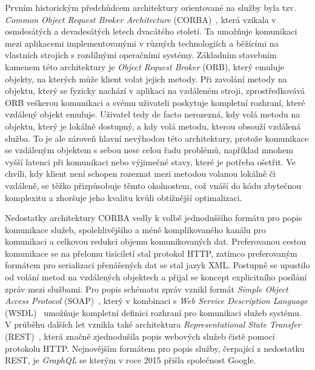 Prvním historickým předchůdcem architektury orientované na služby
byla tzv. \textit{Common Object Request Broker Architecture}
(CORBA)~\cite{siegel2000corba}, která vzikala v osmdesátých a devadesátých letech
dvacátého století. Ta umožňuje komunikaci mezi aplikacemi implementovanými v
různých technologiích a běžícími na vlastních strojích s rozdílnými
operačními systémy. Základním stavebním kamenem této architektury
je \textit{Object Request Broker} (ORB), který emuluje objekty,
na kterých může klient volat jejich metody. Při zavolání metody
na objektu, který se fyzicky nachází v aplikaci na vzdáleném stroji,
zprostředkovává ORB veškerou komunikaci a svému uživateli poskytuje
kompletní rozhraní, které vzdálený objekt emuluje. Uživatel tedy de
facto nerozezná, kdy volá metodu na objektu, který je lokálně dostupný,
a kdy volá metodu, kterou obsouží vzdálená služba. To je ale zároveň
hlavní nevýhodou této architektury, protože komunikace se vzdáleným
objektem s sebou nese celou řadu problémů, například mnohem vyšší latenci
při komunikaci nebo výjimečné stavy, které je potřeba ošetřit. Ve chvíli,
kdy klient není schopen rozeznat mezi metodou volanou lokálně či vzdáleně,
se těžko přizpůsobuje těmto okolnostem, což vnáší do kódu zbytečnou
komplexitu a zhoršuje jeho kvalitu kvůli obtížnější optimalizaci.

Nedostatky architektury CORBA vedly k volbě jednoduššího
formátu pro popis komunikace služeb, spolehlivějšího a méně
komplikovaného kanálu pro komunikaci a celkovou redukci
objemu komunikovaných dat. Preferovanou cestou komunikace
se na přelomu tisíciletí stal protokol HTTP, zatímco preferovaným formátem
pro serializaci přenášených dat se stal jazyk XML.
Postupně se upustilo od volání metod na vzdálených objektech a přijal
se koncept explicitního posílání zpráv mezi službami.
Pro popis schématu zpráv vznikl formát \textit{Simple Object Access
Protocol} (SOAP)~\cite{box2000simple}, který v kombinaci s
\textit{Web Service Description Language} (WSDL)~\cite{christensen2001web}
umožňuje kompletní definici rozhraní pro komunikaci služeb systému.
V průběhu dalších let vznikla také architektura \textit{Representational
State Transfer} (REST)~\cite{fielding2000rest}, která značně zjednodušila
popis webových služeb čistě pomocí protokolu HTTP. Nejnovějším formátem
pro popis služby, čerpající z nedostatku REST, je \textit{GraphQL}
se kterým v roce 2015 přišla společnost Google.

